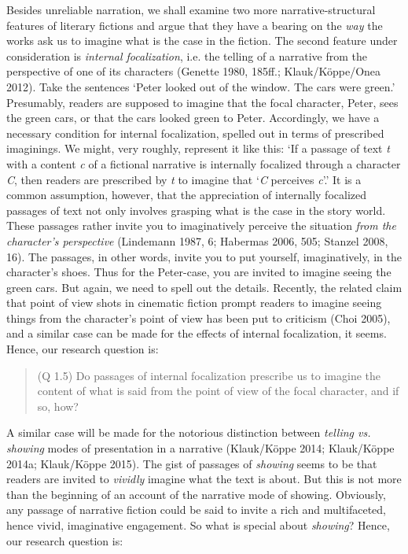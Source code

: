 \noindent Besides unreliable narration, we shall examine two more
narrative-structural features of literary fictions and argue that they
have a bearing on the \emph{way} the works ask us to imagine what is the
case in the fiction. The second feature under consideration is
\emph{internal focalization}, i.e. the telling of a narrative from the
perspective of one of its characters (Genette 1980, 185ff.;
Klauk/K\"oppe/Onea 2012). Take the sentences `Peter looked out of the
window. The cars were green.' Presumably, readers are supposed to
imagine that the focal character, Peter, sees the green cars, or that
the cars looked green to Peter. Accordingly, we have a necessary
condition for internal focalization, spelled out in terms of prescribed
imaginings. We might, very roughly, represent it like this: `If a
passage of text \emph{t} with a content \emph{c} of a fictional
narrative is internally focalized through a character \emph{C}, then
readers are prescribed by \emph{t} to imagine that `\emph{C} perceives
\emph{c}'.' It is a common assumption, however, that the appreciation of
internally focalized passages of text not only involves grasping what is
the case in the story world. These passages rather invite you to
imaginatively perceive the situation \emph{from the character's
perspective} (Lindemann 1987, 6; Habermas 2006, 505; Stanzel 2008, 16).
The passages, in other words, invite you to put yourself, imaginatively,
in the character's shoes. Thus for the Peter-case, you are invited to
imagine seeing the green cars. But again, we need to spell out the
details. Recently, the related claim that point of view shots in
cinematic fiction prompt readers to imagine seeing things from the
character's point of view has been put to criticism (Choi 2005), and a
similar case can be made for the effects of internal focalization, it
seems. Hence, our research question is:

\vspace{-.2cm}
\begin{quote}
(Q 1.5) Do passages of internal focalization prescribe us to imagine
the content of what is said from  the point of view of the focal
character, and if so, how? 
\end{quote}
\vspace{-.2cm}

\noindent A similar case will be made for the notorious distinction between
\emph{telling vs. showing} modes of presentation in a narrative
(Klauk/K\"oppe 2014; Klauk/K\"oppe 2014a; Klauk/K\"oppe 2015). The gist of
passages of \emph{showing} seems to be that readers are invited to
\emph{vividly} imagine what the text is about. But this is not more than
the beginning of an account of the narrative mode of showing. Obviously,
any passage of narrative fiction could be said to invite a rich and
multifaceted, hence vivid, imaginative engagement. So what is special
about \emph{showing}? Hence, our research question is:

